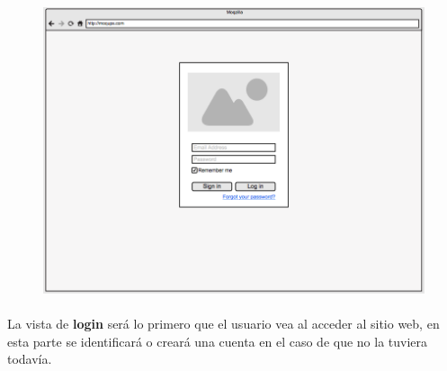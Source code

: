 \documentclass[10pt, a4paper,spanish]{article}
\begin{document}
			\begin{figure}[H]
				\centering
				\begin{minipage}[b]{0.7\textwidth}
					\includegraphics[width=\textwidth]{res/sketch_login.png}
				\end{minipage}
			\end{figure}

			\paragraph{}
			La vista de \textbf{login} será lo primero que el usuario vea al acceder al sitio web, en esta parte se identificará o creará una cuenta en el caso de que no la tuviera todavía.
\end{document}
